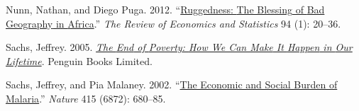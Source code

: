 \documentclass[
  letterpaper,
  DIV=11,
  numbers=noendperiod]{scrartcl}
\newlength{\cslhangindent}
\newenvironment{CSLReferences}[2] %
 {\begin{list}{}{%
  \setlength{\itemindent}{0pt}
  \setlength{\leftmargin}{0pt}
  \setlength{\parsep}{0pt}
  \ifodd #1
   \setlength{\leftmargin}{\cslhangindent}
   \setlength{\itemindent}{-1\cslhangindent}
  \fi
  \setlength{\itemsep}{#2\baselineskip}}}
 {\end{list}}
\begin{document}
\begin{CSLReferences}{1}{0}
Nunn, Nathan, and Diego Puga. 2012.
{``\href{https://www.jstor.org/stable/41349158}{Ruggedness: {The
Blessing} of {Bad Geography} in {Africa}}.''} \emph{The Review of
Economics and Statistics} 94 (1): 20--36.

Sachs, Jeffrey. 2005.
\emph{\href{https://books.google.com?id=uzhveDZnv_gC}{The {End} of
{Poverty}: {How We Can Make} It {Happen} in {Our Lifetime}}}. Penguin
Books Limited.

Sachs, Jeffrey, and Pia Malaney. 2002.
{``\href{https://doi.org/10.1038/415680a}{The Economic and Social Burden
of Malaria}.''} \emph{Nature} 415 (6872): 680--85.

\end{CSLReferences}
\end{document}

